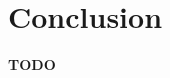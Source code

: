 \documentclass[a4paper]{article}
\begin{document}
	\section{Conclusion}
	\label{sec:conclusion}
	\textbf{TODO}
	
	
	\footnotesize
	
	
	\newpage
\end{document}

